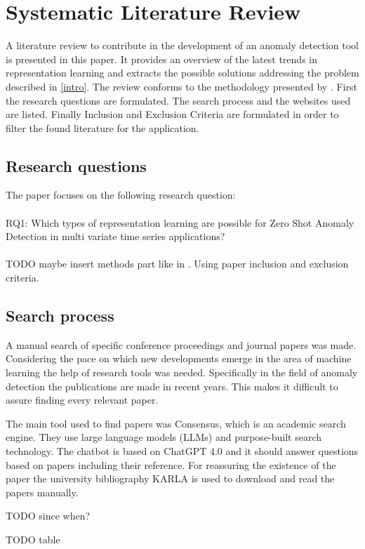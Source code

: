 \section{Systematic Literature Review}\label{methods}
A literature review to contribute in the development of an anomaly detection tool is presented in this paper. It provides an overview of the latest trends in representation learning and extracts the possible solutions addressing the problem described in \ref{intro}. The review conforms to the methodology presented by . First the research questions are formulated. The search process and the websites used are listed. Finally Inclusion and Exclusion Criteria are formulated in order to filter the found literature for the application.
\subsection{Research questions}
The paper focuses on the following research question:\\\\
RQ1: Which types of representation learning are possible for Zero Shot Anomaly Detection in multi variate time series applications?\\\\
TODO maybe insert methods part like in \cite{su_large_2024}. Using paper inclusion and exclusion criteria.
\subsection{Search process}
A manual search of specific conference proceedings and journal papers was made. Considering the pace on which new developments emerge in the area of machine learning the help of research tools was needed. Specifically in the field of anomaly detection the publications are made in recent years. This makes it difficult to assure finding every relevant paper.

The main tool used to find papers was Consensus, which is an academic search engine. They use large language models (LLMs) and purpose-built search technology. The chatbot is based on ChatGPT 4.0 and it should answer questions based on papers including their reference. For reassuring the existence of the paper the university bibliography KARLA is used to download and read the papers manually.

TODO since when?

TODO table 
